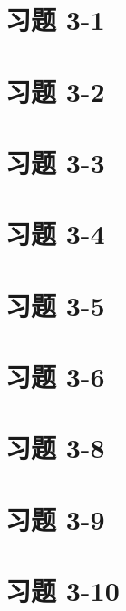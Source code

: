 \documentclass[UTF8,12pt,a4paper]{ctexart} %
\begin{document}
\section*{习题 3-1}



\section*{习题 3-2}



\section*{习题 3-3}



\section*{习题 3-4}



\section*{习题 3-5}



\section*{习题 3-6}

\section*{习题 3-8}



\section*{习题 3-9}

\section*{习题 3-10}


\end{document}
